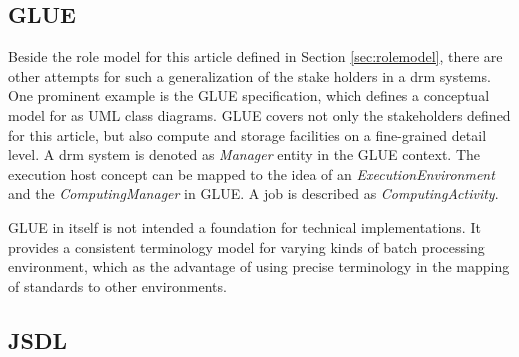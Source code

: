 \documentclass[twocolumn]{svjour3}       %
\begin{document}

% 
%
%



\subsection{GLUE}

Beside the role model for this article defined in Section \ref{sec:rolemodel}, there are other attempts for such a generalization of the stake holders in a \gls{drm} systems. One prominent example is the GLUE specification, which defines a conceptual model for  as UML class diagrams. GLUE covers not only the stakeholders defined for this article, but also compute and storage facilities on a fine-grained detail level. A \gls{drm} system is denoted as \emph{Manager} entity in the GLUE context. The execution host concept can be mapped to the idea of an \emph{ExecutionEnvironment} and the \emph{ComputingManager} in GLUE. A job is described as \emph{ComputingActivity}.


GLUE in itself is not intended a foundation for technical implementations. It provides a consistent terminology model for varying kinds of batch processing environment, which as the advantage of using precise terminology in the mapping of standards to other environments. 

\subsection{JSDL}
\end{document}
